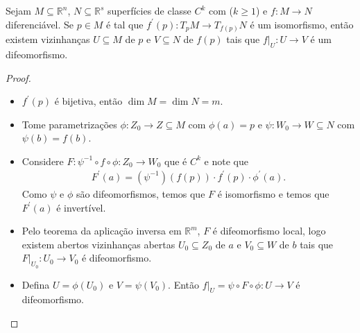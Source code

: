 \begin{theorem}
  Sejam $M\subseteq\mathbb{R}^{n}$, $N\subseteq\mathbb{R}^{s}$ superfícies de classe $C^{k}$ com ($k\geq 1$) e $f:M\to N$ diferenciável. Se $p\in M$ é tal que $f^{\prime}(p):T_{p}M\to T_{f(p)}N$ é um isomorfismo, então existem vizinhanças $U\subseteq M$ de $p$ e $V\subseteq N$ de $f(p)$ tais que $f\big|_{U}:U\to V$ é um difeomorfismo. 
\end{theorem}
\begin{proof} 
  \phantom{xxx}
  \begin{itemize}
    \item $f^{\prime}(p)$ é bijetiva, então $\dim M=\dim N=m$.
    \item Tome parametrizações $\phi:Z_0\to Z\subseteq M$ com $\phi(a)=p$ e $\psi:W_0\to W\subseteq N$ com $\psi(b)=f(b)$.
    \item Considere $F:\psi^{-1}\circ f\circ \phi:Z_0\to W_0$ que é $C^{k}$ e note que
      \begin{align*}
        F^{\prime}(a)=(\psi^{-1})(f(p))\cdot f^{\prime}(p)\cdot\phi^{\prime}(a).
      \end{align*}
      Como $\psi$ e $\phi$ são difeomorfismos, temos que $F$ é isomorfismo e temos que $F^{\prime}(a)$ é invertível.
    \item Pelo teorema da aplicação inversa em $\mathbb{R}^{m}$, $F$ é difeomorfismo local, logo existem abertos vizinhanças abertas $U_0\subseteq Z_0$ de $a$ e $V_0\subseteq W$ de $b$ tais que $F\big|_{U_0}:U_0\to V_0$ é difeomorfismo.
    \item Defina $U=\phi(U_0)$ e $V=\psi(V_0)$. Então $f\big|_{U}=\psi\circ F\circ \phi:U\to V$ é difeomorfismo. 
  \end{itemize}
\end{proof}
